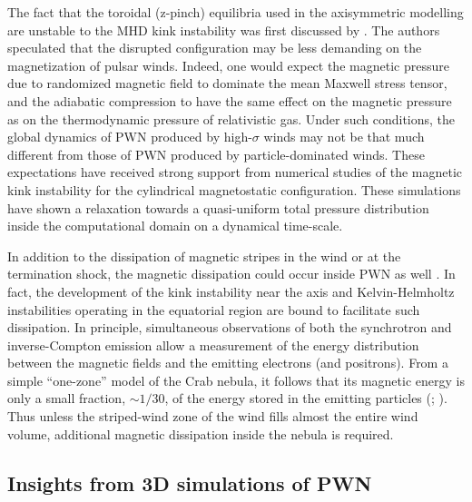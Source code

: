 The fact that the toroidal (z-pinch) equilibria used in the axisymmetric modelling \citep[e.g.][]{begelman1992} are unstable to the MHD kink instability was first discussed by \cite{begelman1998}.  
The authors speculated that the disrupted configuration may be less demanding on the magnetization of pulsar winds. Indeed, one would expect the magnetic pressure due to randomized magnetic field to dominate the mean Maxwell stress tensor, and the adiabatic compression to have the same effect on the magnetic pressure as on the thermodynamic pressure of relativistic gas. Under such conditions, the global dynamics of PWN produced by high-$\sigma$ winds may not be that much different from those of PWN produced by particle-dominated winds. These expectations have received strong support from numerical studies \citep{Mizuno:2011aa} of the magnetic kink instability for the cylindrical magnetostatic configuration.  These simulations have shown a relaxation towards a quasi-uniform total pressure distribution inside the computational domain on a dynamical time-scale. 

In addition to the dissipation of magnetic stripes in the wind or at the termination shock, the magnetic dissipation could occur inside PWN as well \citep{lyutikov2010c,komissarov2013}. In fact, the development of the kink instability near the axis and Kelvin-Helmholtz instabilities operating in the equatorial region \citep{camus2009} are bound to facilitate such dissipation. In principle, simultaneous observations of both the synchrotron and inverse-Compton emission allow a measurement of the energy distribution between the magnetic fields and the emitting electrons (and positrons). From a simple ``one-zone'' model of the Crab nebula, it follows that its magnetic energy is only a small fraction, $\sim1/30$, of the energy stored in the emitting particles (\cite{MeyerHorns2010}; \cite{komissarov2013}). Thus unless the striped-wind zone of the wind fills almost the entire wind volume, additional magnetic dissipation inside the nebula is required.  


\subsection{Insights from 3D simulations of PWN}

